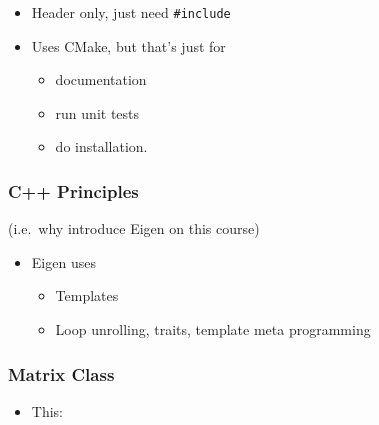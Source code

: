 \begin{itemize}
\itemsep1pt\parskip0pt
\item
  Header only, just need \texttt{\#include}
\item
  Uses CMake, but that's just for

  \begin{itemize}
  \itemsep1pt\parskip0pt
  \item
    documentation
  \item
    run unit tests
  \item
    do installation.
  \end{itemize}
\end{itemize}

\subsubsection{C++ Principles}\label{c-principles}

(i.e.~why introduce Eigen on this course)

\begin{itemize}
\itemsep1pt\parskip0pt
\item
  Eigen uses

  \begin{itemize}
  \itemsep1pt\parskip0pt
  \item
    Templates
  \item
    Loop unrolling, traits, template meta programming
  \end{itemize}
\end{itemize}

\subsubsection{Matrix Class}\label{matrix-class}

\begin{itemize}
\itemsep1pt\parskip0pt
\item
  This:
\end{itemize}

\begin{Shaded}
\begin{Highlighting}[]
 
 
\NormalTok{\{}
  \NormalTok{,}\NormalTok{);}
  \NormalTok{,}\NormalTok{) = }\NormalTok{;}
  \NormalTok{,}\NormalTok{) = }\NormalTok{;}
  \NormalTok{,}\NormalTok{) = -}\NormalTok{;}
  \NormalTok{,}\NormalTok{,}\NormalTok{,}\NormalTok{);}
\NormalTok{\}}
\end{Highlighting}
\end{Shaded}

